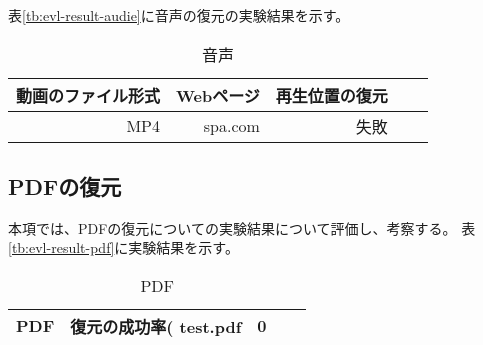 表\ref{tb:evl-result-audie}に音声の復元の実験結果を示す。

\begin{table}[htbp]
  \caption{音声}
  \label{tab:evl-result-audio}
  \begin{center}
    \begin{tabular}{rrrrr}
      \hline
      動画のファイル形式 & Webページ & 再生位置の復元 \\ \hline \hline
      MP4 & spa.com & 失敗  \\ \hline
    \end{tabular}
  \end{center}
\end{table}

\subsection{PDFの復元}
本項では、PDFの復元についての実験結果について評価し、考察する。
表\ref{tb:evl-result-pdf}に実験結果を示す。

\begin{table}[htbp]
  \caption{PDF}
  \label{tab:evl-result-video}
  \begin{center}
    \begin{tabular}{rrrrr}
      \hline
      PDF  & 復元の成功率(%
      test.pdf  & 0  \\ \hline
    \end{tabular}
  \end{center}
\end{table}
